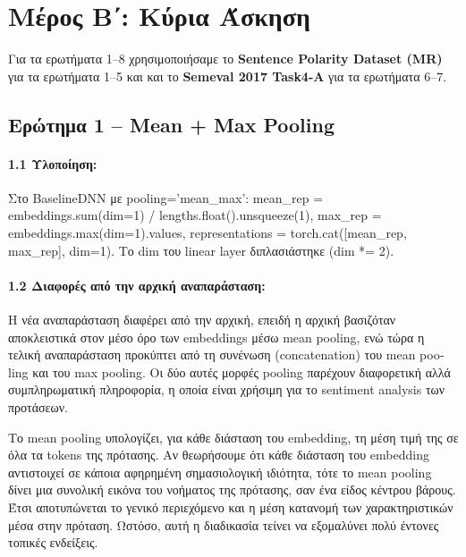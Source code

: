 \documentclass[11pt,a4paper]{article}
\begin{document}
\newpage
{}
\section*{Μέρος Β΄: Κύρια Άσκηση}

Για τα ερωτήματα 1--8 χρησιμοποιήσαμε το \textbf{\textlatin{Sentence Polarity Dataset (MR)}} για τα ερωτήματα 1--5 και και το \textbf{\textlatin{Semeval 2017 Task4-A}} για τα ερωτήματα 6--7.

\subsection*{Ερώτημα 1 -- \textlatin{Mean + Max Pooling}}

\paragraph{1.1 Υλοποίηση:}


Στο \textlatin{BaselineDNN} με \textlatin{pooling='mean\_max'}: \textlatin{mean\_rep = embeddings.sum(dim=1) / lengths.float().unsqueeze(1)}, 
\textlatin{max\_rep = embeddings.max(dim=1).values}, \textlatin{representations = torch.cat([mean\_rep, max\_rep], dim=1)}. Το \textlatin{dim} του 
\textlatin{linear layer} διπλασιάστηκε (\textlatin{dim *= 2}).

\paragraph{1.2 Διαφορές από την αρχική αναπαράσταση:}

Η νέα αναπαράσταση διαφέρει από την αρχική, επειδή η αρχική βασιζόταν αποκλειστικά στον μέσο όρο των \textlatin{embeddings} μέσω 
\textlatin{mean pooling}, ενώ τώρα η τελική αναπαράσταση προκύπτει από τη συνένωση (\textlatin{concatenation}) του \textlatin{mean pooling} 
και του \textlatin{max pooling}. Οι δύο αυτές μορφές \textlatin{pooling} παρέχουν διαφορετική αλλά συμπληρωματική πληροφορία, 
η οποία είναι χρήσιμη για το \textlatin{sentiment analysis} των προτάσεων.

Το \textlatin{mean pooling} υπολογίζει, για κάθε διάσταση του \textlatin{embedding}, τη μέση τιμή της σε όλα τα \textlatin{tokens} της πρότασης. 
Αν θεωρήσουμε ότι κάθε διάσταση του \textlatin{embedding} αντιστοιχεί σε κάποια αφηρημένη σημασιολογική ιδιότητα, τότε το \textlatin{mean pooling} 
δίνει μια συνολική εικόνα του νοήματος της πρότασης, σαν ένα είδος κέντρου βάρους. Έτσι αποτυπώνεται το γενικό περιεχόμενο και η μέση 
κατανομή των χαρακτηριστικών μέσα στην πρόταση. Ωστόσο, αυτή η διαδικασία τείνει να εξομαλύνει πολύ έντονες τοπικές ενδείξεις.
\end{document}
